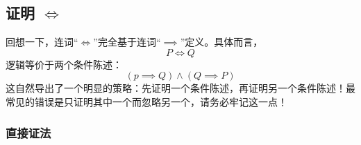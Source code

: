 \subsection{证明 $\iff$}\label{sec:section4.9.6}

回想一下，连词``$\iff$''完全基于连词``$\implies$''定义。具体而言，
\[P \iff Q\]
逻辑等价于两个条件陈述：
\[(p \implies Q) \land (Q \implies P)\]
这自然导出了一个明显的策略：先证明一个条件陈述，再证明另一个条件陈述！最常见的错误是只证明其中一个而忽略另一个，请务必牢记这一点！

\subsubsection*{直接证法}

\begin{center}
    \noindent {}
\end{center}


